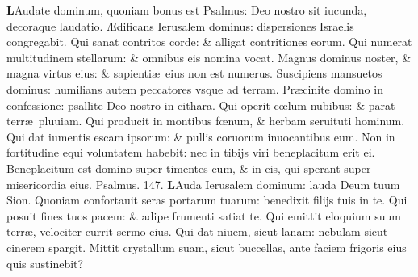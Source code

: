 \documentclass[a5paper,10pt]{book}
\def\ae{æ}
\def\AE{Æ}
\def\oe{œ}
\begin{document}
\begin{multicols*}{2}
\vspace{-.25em}
\lettrine[lines=2]{\bfseries \color{red} L}{}Audate dominum, quoniam bonus est Psalmus: Deo nostro sit iucunda, decoraque laudatio.
\newline \color{red} \AE\color{black}dificans Ierusalem dominus: dispersiones Israelis congregabit.
\newline \color{red} Q\color{black}ui sanat contritos corde: \& alligat contritiones eorum.
\newline \color{red} Q\color{black}ui numerat multitudinem stellarum: \& omnibus eis nomina vocat.
\newline \color{red} M\color{black}agnus dominus noster, \& magna virtus eius: \& sapienti\ae \ eius non est numerus.
\newline \color{red} S\color{black}uscipiens mansuetos dominus: humilians autem peccatores vsque ad terram.
\newline \color{red} P\color{black}r\ae cinite domino in confessione: psallite Deo nostro in cithara.
\newline \color{red} Q\color{black}ui operit c\oe lum nubibus: \& parat terr\ae \ pluuiam.
\newline \color{red} Q\color{black}ui producit in montibus f\oe num, \& herbam seruituti hominum.
\newline \color{red} Q\color{black}ui dat iumentis escam ipsorum: \& pullis coruorum inuocantibus eum.
\newline \color{red} N\color{black}on in fortitudine equi voluntatem habebit: nec in tibijs viri beneplacitum erit ei.
\newline \color{red} B\color{black}eneplacitum est domino super timentes eum, \& in eis, qui sperant super misericordia eius. \quad \color{red} Psalmus. \hypertarget{ps147}{147.} \color{black}
\vspace{-.25em}
\lettrine[lines=2]{\bfseries \color{red} L}{}Auda Ierusalem dominum: lauda Deum tuum Sion.
\newline \color{red} Q\color{black}uoniam confortauit seras portarum tuarum: benedixit filijs tuis in te.
\newline \color{red} Q\color{black}ui posuit fines tuos pacem: \& adipe frumenti satiat te.
\newline \color{red} Q\color{black}ui emittit eloquium suum terr\ae , velociter currit sermo eius.
\newline \color{red} Q\color{black}ui dat niuem, sicut lanam: nebulam sicut cinerem spargit.
\newline \color{red} M\color{black}ittit crystallum suam, sicut buccellas, ante faciem frigoris eius quis sustinebit?

\end{multicols*}
\end{document}
